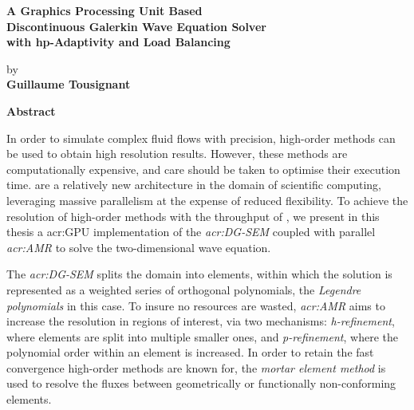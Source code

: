 \thispagestyle{plain} %

\begin{center}
    \vspace*{0.5cm} %
    { \Large
        \textbf{A Graphics Processing Unit Based \\ 
            Discontinuous Galerkin Wave Equation Solver \\
            with hp-Adaptivity and Load Balancing \\
        }
    }
    \vspace{0.4cm}
    \large

    by \\
    \vspace{0.4cm}
    \textbf{Guillaume Tousignant}

    \vspace{0.9cm}
    \textbf{Abstract}
\end{center}

In order to simulate complex fluid flows with precision, high-order methods can be used to obtain
high resolution results. However, these methods are computationally expensive, and care should be
taken to optimise their execution time. \textit{} are a relatively new
architecture in the domain of scientific computing, leveraging massive parallelism at the expense of
reduced flexibility. To achieve the resolution of high-order methods with the throughput of
, we present in this thesis a \acrshort{acr:GPU} implementation of the
\textit{\acrfull{acr:DG-SEM}} coupled with parallel \textit{\acrfull{acr:AMR}} to solve the
two-dimensional wave equation. 

The \textit{\acrlong{acr:DG-SEM}} splits the domain into elements, within which the solution is
represented as a weighted series of orthogonal polynomials, the \textit{Legendre polynomials} in
this case. To insure no resources are wasted, \textit{\acrlong{acr:AMR}} aims to increase the
resolution in regions of interest, via two mechanisms: \textit{h-refinement}, where elements are
split into multiple smaller ones, and \textit{p-refinement}, where the polynomial order within an
element is increased. In order to retain the fast convergence high-order methods are known for, the
\textit{mortar element method} is used to resolve the fluxes between geometrically or functionally
non-conforming elements.

